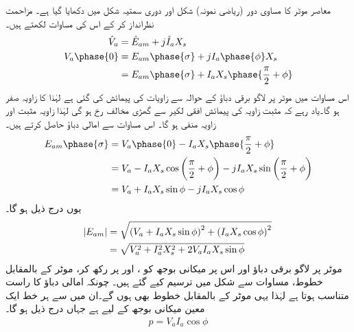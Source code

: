 معاصر موٹر کا مساوی دور (ریاضی نمونہ) شکل    اور دوری سمتیہ شکل   میں دکھایا گیا ہے۔  مزاحمت نظرانداز کر کے اس کی مساوات لکھتے ہیں۔
\begin{gather}
\begin{aligned}
\hat{V}_a&=\hat{E}_{am}+j \hat{I}_a X_s\\
V_a \phase{0}&=E_{am} \phase{\sigma} +j I_a \phase{\phi} X_s\\
&=E_{am} \phase{\sigma} +I_a X_s \phase{\frac{\pi}{2}+\phi}
\end{aligned}
\end{gather}
اس مساوات میں موٹر پر لاگو برقی دباؤ  کے حوالہ سے زاویات کی پیمائش کی گئی ہے لہٰذا    کا زاویہ صفر ہو گا۔یاد رہے کہ مثبت زاویہ کی پیمائش افقی لکیر سے گھڑی  مخالف رخ ہو گی  لہٰذا  زاویہ مثبت اور  زاویہ منفی ہو گا۔ اس مساوات سے امالی دباؤ   حاصل کرتے ہیں۔
\begin{align*}
E_{am}\phase{\sigma}&=V_a \phase{0}-I_a X_s \phase{\frac{\pi}{2}+\phi}\\
&=V_a -I_a X_s  \cos \left( \frac{\pi}{2}+\phi\right)- j I_a X_s \sin \left(\frac{\pi}{2}+\phi \right)\\
&=V_a +I_a X_s \sin \phi-j I_a X_s \cos \phi
\end{align*}
یوں  درج ذیل ہو گا۔
\begin{gather}
\begin{aligned}\label{مسوات_معاصر_دوری_مساوات}
\abs{E_{am}}&=\sqrt{\left(V_a +I_a X_s \sin \phi \right)^2+\left(I_a X_s \cos \phi \right)^2}\\
&=\sqrt{V_a^2+I_a^2 X_s^2+ 2 V_a I_a X_s \sin \phi}
\end{aligned}
\end{gather}
موٹر پر لاگو برقی دباؤ اور اس پر میکانی بوجھ کو ،  اور  پر رکھ کر، موٹر کے  بالمقابل   خطوط،  مساوات  سے  شکل    میں  ترسیم کیے گئے ہیں۔ چونکہ امالی دباؤ  کا راست متناسب ہوتا ہے  لہٰذا یہی موٹر کے  بالمقابل  خطوط بھی ہوں گے۔ان میں سے ہر خط ایک معین میکانی بوجھ  کے لیے ہے جہاں  درج ذیل ہو گا۔
\begin{align}\label{مساوات_معاصر_طاقت_برابر_دباو_رو_جزو_طاقت}
p=V_a I_a \cos \phi
\end{align}
